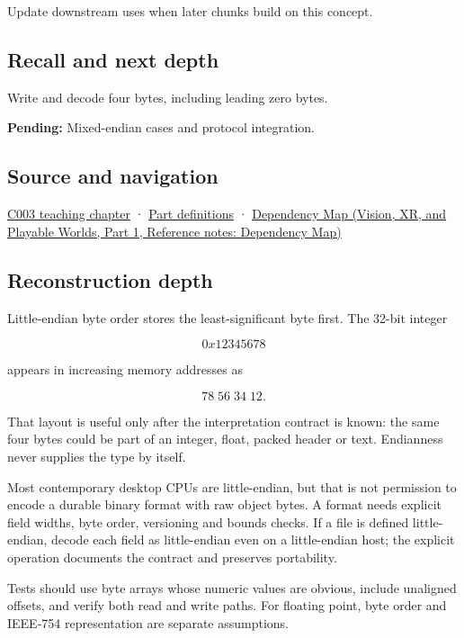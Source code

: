 \hypertarget{appendix-367b6abf460e-used-by}{}

Update downstream uses when later chunks build on this concept.

\subsection{Recall and next depth}\label{appendix-367b6abf460e-recall-and-next-depth}

\hypertarget{appendix-367b6abf460e-recall-and-next-depth}{}

Write and decode four bytes, including leading zero bytes.

\textbf{Pending:} Mixed-endian cases and protocol integration.

\subsection{Source and navigation}\label{appendix-367b6abf460e-source-and-navigation}

\hypertarget{appendix-367b6abf460e-source-and-navigation}{}

\hyperref[01-foundations-i-ch002-where-the-bytes-live]{C003 teaching chapter} · \hyperref[appendix-fd090d982a15-m003---parts-41-60]{Part definitions} · \href{../07-Vision-XR-and-Playable-Worlds-P01/main.pdf\#appendix-4ad47bdd269a}{Dependency Map (Vision, XR, and Playable Worlds, Part 1, Reference notes: Dependency Map)}

\subsection{Reconstruction depth}\label{appendix-367b6abf460e-reconstruction-depth}

\hypertarget{appendix-367b6abf460e-reconstruction-depth}{}

Little-endian byte order stores the least-significant byte first. The 32-bit integer

\[
0x12345678
\]

appears in increasing memory addresses as

\[
78\;56\;34\;12.
\]

That layout is useful only after the interpretation contract is known: the same four bytes could be part of an integer, float, packed header or text. Endianness never supplies the type by itself.

Most contemporary desktop CPUs are little-endian, but that is not permission to encode a durable binary format with raw object bytes. A format needs explicit field widths, byte order, versioning and bounds checks. If a file is defined little-endian, decode each field as little-endian even on a little-endian host; the explicit operation documents the contract and preserves portability.

Tests should use byte arrays whose numeric values are obvious, include unaligned offsets, and verify both read and write paths. For floating point, byte order and IEEE-754 representation are separate assumptions.
